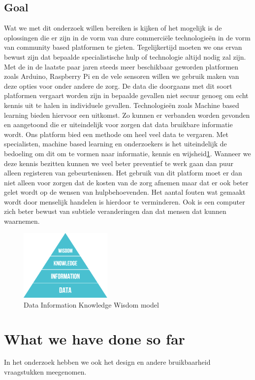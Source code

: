 \documentclass{below-ext}
\begin{document}
\subsection{Goal}
Wat we met dit onderzoek willen bereiken is kijken of het mogelijk is de oplossingen die er zijn in de vorm van dure commerciële technologieën in de vorm van community based platformen te gieten. Tegelijkertijd moeten we ons ervan bewust zijn dat bepaalde specialistische hulp of technologie altijd nodig zal zijn. Met de in de laatste paar jaren steeds meer beschikbaar geworden platformen zoals Arduino, Raspberry Pi en de vele sensoren willen we gebruik maken van deze opties voor onder andere de zorg. De data die doorgaans met dit soort platformen vergaart worden zijn in bepaalde gevallen niet secuur genoeg om echt kennis uit te halen in individuele gevallen. Technologieën zoals Machine based learning bieden hiervoor een uitkomst. Zo kunnen er verbanden worden gevonden en aangetoond die er uiteindelijk voor zorgen dat data bruikbare informatie wordt. Ons platform bied een methode om heel veel data te vergaren. Met specialisten, machine based learning en onderzoekers is het uiteindelijk de bedoeling om dit om te vormen naar informatie, kennis en wijsheid\ref{fig:dikw}. Wanneer we deze kennis bezitten kunnen we veel beter preventief te werk gaan dan puur alleen registeren van gebeurtenissen. Het gebruik van dit platform moet er dan niet alleen voor zorgen dat de kosten van de zorg afnemen maar dat er ook beter gelet wordt op de wensen van hulpbehoevenden. Het aantal fouten wat gemaakt wordt door menselijk handelen is hierdoor te verminderen. Ook is een computer zich beter bewust van subtiele veranderingen dan dat mensen dat kunnen waarnemen. 
\begin{figure}
\center
\label{fig:dikw}
\includegraphics[width=0.4\textwidth]{dikw}
\caption{Data Information Knowledge Wisdom model}
\end{figure}
\section{What we have done so far}
In het onderzoek hebben we ook het design en andere bruikbaarheid vraagstukken meegenomen. 
\end{document}
